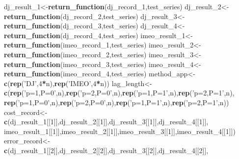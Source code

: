\documentclass[
]{article}
\newenvironment{Shaded}{\begin{snugshade}}{\end{snugshade}}
\newcommand{\DecValTok}[1]{\textcolor[rgb]{0.00,0.00,0.81}{#1}}
\newcommand{\KeywordTok}[1]{\textcolor[rgb]{0.13,0.29,0.53}{\textbf{#1}}}
\newcommand{\NormalTok}[1]{#1}
\newcommand{\OperatorTok}[1]{\textcolor[rgb]{0.81,0.36,0.00}{\textbf{#1}}}
\newcommand{\StringTok}[1]{\textcolor[rgb]{0.31,0.60,0.02}{#1}}
\begin{document}
\begin{Shaded}
\begin{Highlighting}[]
\NormalTok{dj_result_}\DecValTok{1}\NormalTok{<-}\KeywordTok{return_function}\NormalTok{(dj_record_}\DecValTok{1}\NormalTok{,test_series)}
\NormalTok{dj_result_}\DecValTok{2}\NormalTok{<-}\KeywordTok{return_function}\NormalTok{(dj_record_}\DecValTok{2}\NormalTok{,test_series)}
\NormalTok{dj_result_}\DecValTok{3}\NormalTok{<-}\KeywordTok{return_function}\NormalTok{(dj_record_}\DecValTok{3}\NormalTok{,test_series)}
\NormalTok{dj_result_}\DecValTok{4}\NormalTok{<-}\KeywordTok{return_function}\NormalTok{(dj_record_}\DecValTok{4}\NormalTok{,test_series)}
\NormalTok{imeo_result_}\DecValTok{1}\NormalTok{<-}\KeywordTok{return_function}\NormalTok{(imeo_record_}\DecValTok{1}\NormalTok{,test_series)}
\NormalTok{imeo_result_}\DecValTok{2}\NormalTok{<-}\KeywordTok{return_function}\NormalTok{(imeo_record_}\DecValTok{2}\NormalTok{,test_series)}
\NormalTok{imeo_result_}\DecValTok{3}\NormalTok{<-}\KeywordTok{return_function}\NormalTok{(imeo_record_}\DecValTok{3}\NormalTok{,test_series)}
\NormalTok{imeo_result_}\DecValTok{4}\NormalTok{<-}\KeywordTok{return_function}\NormalTok{(imeo_record_}\DecValTok{4}\NormalTok{,test_series)}
\NormalTok{method_app<-}\KeywordTok{c}\NormalTok{(}\KeywordTok{rep}\NormalTok{(}\StringTok{'DJ'}\NormalTok{,}\DecValTok{4}\OperatorTok{*}\NormalTok{n),}\KeywordTok{rep}\NormalTok{(}\StringTok{'IMEO'}\NormalTok{,}\DecValTok{4}\OperatorTok{*}\NormalTok{n))}
\NormalTok{lag_length<-}\KeywordTok{c}\NormalTok{(}\KeywordTok{rep}\NormalTok{(}\StringTok{'p=1,P=0'}\NormalTok{,n),}\KeywordTok{rep}\NormalTok{(}\StringTok{'p=2,P=0'}\NormalTok{,n),}\KeywordTok{rep}\NormalTok{(}\StringTok{'p=1,P=1'}\NormalTok{,n),}\KeywordTok{rep}\NormalTok{(}\StringTok{'p=2,P=1'}\NormalTok{,n),}
              \KeywordTok{rep}\NormalTok{(}\StringTok{'p=1,P=0'}\NormalTok{,n),}\KeywordTok{rep}\NormalTok{(}\StringTok{'p=2,P=0'}\NormalTok{,n),}\KeywordTok{rep}\NormalTok{(}\StringTok{'p=1,P=1'}\NormalTok{,n),}\KeywordTok{rep}\NormalTok{(}\StringTok{'p=2,P=1'}\NormalTok{,n))}
\NormalTok{cost_record<-}\KeywordTok{c}\NormalTok{(dj_result_}\DecValTok{1}\NormalTok{[[}\DecValTok{1}\NormalTok{]],dj_result_}\DecValTok{2}\NormalTok{[[}\DecValTok{1}\NormalTok{]],dj_result_}\DecValTok{3}\NormalTok{[[}\DecValTok{1}\NormalTok{]],dj_result_}\DecValTok{4}\NormalTok{[[}\DecValTok{1}\NormalTok{]],}
\NormalTok{               imeo_result_}\DecValTok{1}\NormalTok{[[}\DecValTok{1}\NormalTok{]],imeo_result_}\DecValTok{2}\NormalTok{[[}\DecValTok{1}\NormalTok{]],imeo_result_}\DecValTok{3}\NormalTok{[[}\DecValTok{1}\NormalTok{]],imeo_result_}\DecValTok{4}\NormalTok{[[}\DecValTok{1}\NormalTok{]])}
\NormalTok{error_record<-}\KeywordTok{c}\NormalTok{(dj_result_}\DecValTok{1}\NormalTok{[[}\DecValTok{2}\NormalTok{]],dj_result_}\DecValTok{2}\NormalTok{[[}\DecValTok{2}\NormalTok{]],dj_result_}\DecValTok{3}\NormalTok{[[}\DecValTok{2}\NormalTok{]],dj_result_}\DecValTok{4}\NormalTok{[[}\DecValTok{2}\NormalTok{]],}

\end{Highlighting}
\end{Shaded}
\end{document}
